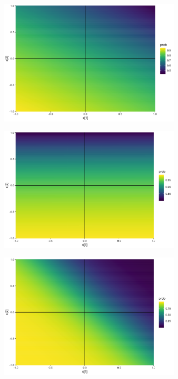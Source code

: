 \documentclass[10pt,mathserif]{beamer}
\begin{document}
\begin{frame}
\begin{figure}
\begin{subfigure}{.1\textwidth}
    \end{subfigure}
    \begin{subfigure}{.1\textwidth}
      \centering
      \includegraphics[width=0.1\paperwidth]{figure/sigmoid_plot_3}
    \end{subfigure}
    \begin{subfigure}{.1\textwidth}
      \centering
      \includegraphics[width=0.1\paperwidth]{figure/sigmoid_plot_4}
    \end{subfigure}
    \begin{subfigure}{.1\textwidth}
      \centering
      \includegraphics[width=0.1\paperwidth]{figure/sigmoid_plot_5}

\end{subfigure}
\end{figure}
\end{frame}
\end{document}
